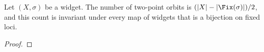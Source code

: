 
\begin{conjecture}\label{dm-0006}
Let $(X,\sigma)$ be a widget. The number of two-point orbits is $(|X| - |\Fix(\sigma)|)/2$, and this count is invariant under every map of widgets that is a bijection on fixed loci.
\end{conjecture}
\begin{proof}
\end{proof}
